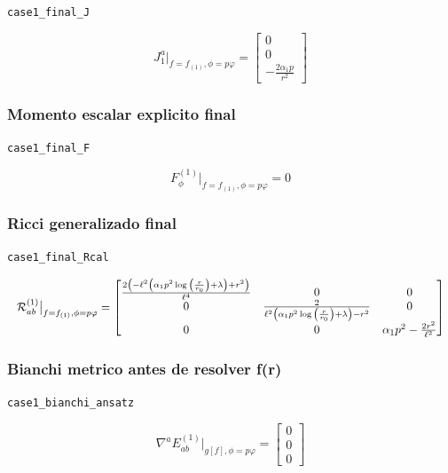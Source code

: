 \documentclass[11pt,a4paper]{article}
\begin{document}
\noindent\texttt{case1\_final\_J}\par\nopagebreak[4]

\[
J_1^a\big|_{f=f_{(1)},\phi=p\varphi} = \left[\begin{matrix}0\\0\\- \frac{2 \alpha_{1} p}{r^{2}}\end{matrix}\right]
\]

\subsubsection{Momento escalar explicito final}

\noindent\texttt{case1\_final\_F}\par\nopagebreak[4]

\[
F_\phi^{(1)}\big|_{f=f_{(1)},\phi=p\varphi} = 0
\]

\subsubsection{Ricci generalizado final}

\noindent\texttt{case1\_final\_Rcal}\par\nopagebreak[4]

\[
\resizebox{\textwidth}{!}{$\displaystyle \mathcal R^{(1)}_{ab}\big|_{f=f_{(1)},\phi=p\varphi} = \left[\begin{matrix}\frac{2 \left(- \ell^{2} \left(\alpha_{1} p^{2} \log{\left(\frac{r}{r_{0}} \right)} + \lambda\right) + r^{2}\right)}{\ell^{4}} & 0 & 0\\0 & \frac{2}{\ell^{2} \left(\alpha_{1} p^{2} \log{\left(\frac{r}{r_{0}} \right)} + \lambda\right) - r^{2}} & 0\\0 & 0 & \alpha_{1} p^{2} - \frac{2 r^{2}}{\ell^{2}}\end{matrix}\right]$}
\]

\subsubsection{Bianchi metrico antes de resolver f(r)}

\noindent\texttt{case1\_bianchi\_ansatz}\par\nopagebreak[4]

\[
\nabla^aE^{(1)}_{ab}\big|_{g[f],\phi=p\varphi} = \left[\begin{matrix}0\\0\\0\end{matrix}\right]
\]
\end{document}
